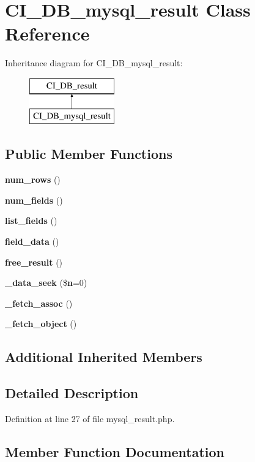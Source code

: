 \section{C\-I\-\_\-\-D\-B\-\_\-mysql\-\_\-result Class Reference}
\label{class_c_i___d_b__mysql__result}
Inheritance diagram for C\-I\-\_\-\-D\-B\-\_\-mysql\-\_\-result\-:\begin{figure}[H]
\begin{center}
\leavevmode
\includegraphics[height=2.000000cm]{class_c_i___d_b__mysql__result}
\end{center}
\end{figure}
\subsection*{Public Member Functions}
\begin{DoxyCompactItemize}
\item 
{\bf num\-\_\-rows} ()
\item 
{\bf num\-\_\-fields} ()
\item 
{\bf list\-\_\-fields} ()
\item 
{\bf field\-\_\-data} ()
\item 
{\bf free\-\_\-result} ()
\item 
{\bf \-\_\-data\-\_\-seek} (\${\bf n}=0)
\item 
{\bf \-\_\-fetch\-\_\-assoc} ()
\item 
{\bf \-\_\-fetch\-\_\-object} ()
\end{DoxyCompactItemize}
\subsection*{Additional Inherited Members}


\subsection{Detailed Description}


Definition at line 27 of file mysql\-\_\-result.\-php.



\subsection{Member Function Documentation}
